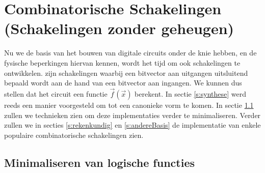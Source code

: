 \chapter{Combinatorische Schakelingen (Schakelingen zonder geheugen)}
\begin{chapterintro}
Nu we de basis van het bouwen van digitale circuits onder de knie hebben, en de fysische beperkingen hiervan kennen, wordt het tijd om ook schakelingen te ontwikkelen.  zijn schakelingen waarbij een bitvector aan uitgangen uitsluitend bepaald wordt aan de hand van een bitvector aan ingangen. We kunnen dus stellen dat het circuit een functie $\vec{f}(\vec{x})$ berekent. In sectie \ref{s:synthese} werd reeds een manier voorgesteld om tot een canonieke vorm te komen. In sectie \ref{s:minimalisatie} zullen we technieken zien om deze implementaties verder te minimaliseren. Verder zullen we in secties \ref{s:rekenkundig} en \ref{s:andereBasis} de implementatie van enkele populaire combinatorische schakelingen zien.%
\end{chapterintro}
\minitoc[n]
\section{Minimaliseren van logische functies}
\label{s:minimalisatie}
